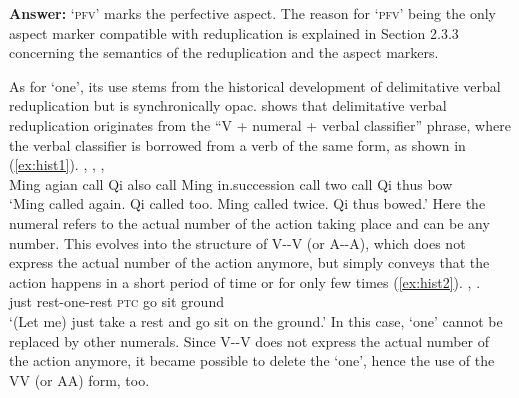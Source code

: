 \documentclass[fleqn,twoside]{article}
\begin{document}
\begin{enumerate}
\textbf{Answer:}
 `\textsc{pfv}' marks the perfective aspect.
The reason for  `\textsc{pfv}' being the only aspect marker compatible with reduplication is explained in Section 2.3.3 concerning the semantics of the reduplication and the aspect markers.

As for  `one', its use stems from the historical development of delimitative verbal reduplication but is synchronically opac.
\citet[13--15]{Zhang2000} shows that delimitative verbal reduplication originates from the ``V + numeral + verbal classifier'' phrase,
where the verbal classifier is borrowed from a verb of the same form, as shown in (\ref{ex:hist1}).
\ea\label{ex:hist1}
\gll {}  ,   ,     ,   \footnotemark\\
Ming agian call Qi also call Ming in.succession call two call Qi thus bow\\
\glt `Ming called again. Qi called too. Ming called twice. Qi thus bowed.'
\z
{}
Here the numeral refers to the actual number of the action taking place
and can be any number.
This evolves into the structure of V--V (or A--A), which does not express the actual number of the action anymore,
but simply conveys that the action happens in a short period of time or for only few times (\ref{ex:hist2}).
\ea\label{ex:hist2}
\gll {}  ,   .\footnotemark\\
just rest-one-rest \textsc{ptc} go sit ground\\
\glt `(Let me) just take a rest and go sit on the ground.'
\z
{}
In this case,  `one' cannot be replaced by other numerals.
Since V--V does not express the actual number of the action anymore,
it became possible to delete the  `one',
hence the use of the VV (or AA) form, too.


\end{enumerate}
\end{document}

